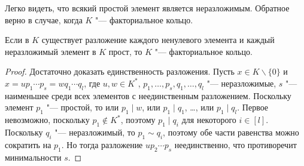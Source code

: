 \begin{note}
	Легко видеть, что всякий простой элемент является неразложимым. Обратное верно в случае, когда $K$ "--- факториальное кольцо.
\end{note}

\begin{proposition}
	Если в $K$ существует разложение каждого ненулевого элемента и каждый неразложимый элемент в $K$ прост, то $K$ "--- факториальное кольцо.
\end{proposition}

\begin{proof}
	Достаточно доказать единственность разложения. Пусть $x \in K\backslash\{0\}$ и $x = up_1\dotsm p_s = wq_1\dotsm q_l$, где $u, w \in K^*$, $p_1, \dotsc, p_s, q_1, \dotsc, q_l$ "--- неразложимые, $s$ "--- наименьшее среди всех элементов с неединственным разложением. Поскольку элемент $p_1$ "--- простой, то или $p_1\mid w$, или $p_1 \mid q_1$, \dots, или $p_1 \mid q_l$. Первое невозможно, поскольку $p_1 \not\in K^*$, поэтому $p_1 \mid q_i$ для некоторого $i \in [l]$. Поскольку $q_i$ "--- неразложимый, то $p_1 \sim q_i$, поэтому обе части равенства можно сократить на $p_1$. Но тогда разложение $up_2\dotsm p_s$ неединственно, что противоречит минимальности $s$.
\end{proof}